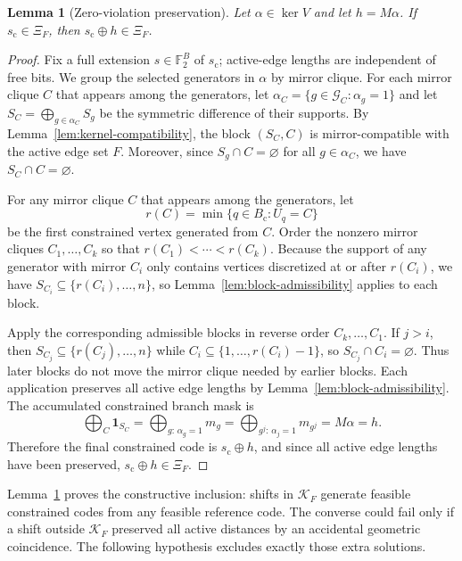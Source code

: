 \documentclass[11pt]{article}
\theoremstyle{plain}
\newtheorem{lemma}{Lemma}
\theoremstyle{definition}
\begin{document}
\begin{lemma}[Zero-violation preservation]
\label{lem:preservation}
Let $\alpha \in \ker V$ and let $h = M\alpha$. If $s_{\mathrm{c}} \in \Xi_F$, then $s_{\mathrm{c}} \oplus h \in \Xi_F$.
\end{lemma}

\begin{proof}
Fix a full extension $s\in\mathbb{F}_2^B$ of $s_{\mathrm{c}}$; active-edge lengths are independent of free bits. We group the selected generators in $\alpha$ by mirror clique. For each mirror clique $C$ that appears among the generators, let $\alpha_C = \{g \in \mathcal{G}_C : \alpha_g = 1\}$ and let $S_C = \bigoplus_{g \in \alpha_C} S_g$ be the symmetric difference of their supports. By Lemma~\ref{lem:kernel-compatibility}, the block $(S_C, C)$ is mirror-compatible with the active edge set $F$. Moreover, since $S_g \cap C = \varnothing$ for all $g \in \alpha_C$, we have $S_C \cap C = \varnothing$.

For any mirror clique $C$ that appears among the generators, let
\[
r(C)=\min\{q\in B_{\mathrm{c}}: U_q=C\}
\]
be the first constrained vertex generated from $C$. Order the nonzero mirror cliques $C_1,\ldots,C_k$ so that $r(C_1)<\cdots<r(C_k)$. Because the support of any generator with mirror $C_i$ only contains vertices discretized at or after $r(C_i)$, we have $S_{C_i}\subseteq\{r(C_i),\ldots,n\}$, so Lemma~\ref{lem:block-admissibility} applies to each block.

Apply the corresponding admissible blocks in reverse order $C_k,\ldots,C_1$. If $j>i$, then $S_{C_j}\subseteq\{r(C_j),\ldots,n\}$ while $C_i\subseteq\{1,\ldots,r(C_i)-1\}$, so $S_{C_j}\cap C_i=\varnothing$. Thus later blocks do not move the mirror clique needed by earlier blocks. Each application preserves all active edge lengths by Lemma~\ref{lem:block-admissibility}. The accumulated constrained branch mask is
\[
\bigoplus_C \mathbf{1}_{S_C}
=
\bigoplus_{g:\,\alpha_g=1} m_g
=
\bigoplus_{g^j:\,\alpha_j=1} m_{g^j}
=
M\alpha
=
h.
\]
Therefore the final constrained code is $s_{\mathrm{c}}\oplus h$, and since all active edge lengths have been preserved, $s_{\mathrm{c}}\oplus h\in\Xi_F$.
\end{proof}

Lemma~\ref{lem:preservation} proves the constructive inclusion: shifts in $\mathcal{K}_F$ generate feasible constrained codes from any feasible reference code. The converse could fail only if a shift outside $\mathcal{K}_F$ preserved all active distances by an accidental geometric coincidence. The following hypothesis excludes exactly those extra solutions.
\end{document}
